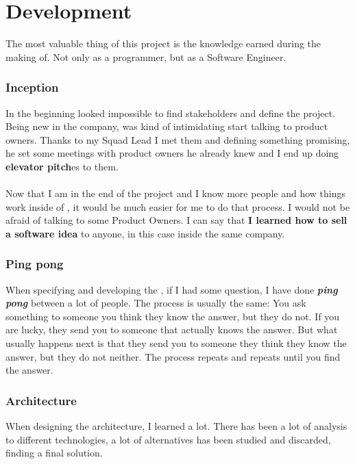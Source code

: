 \section{Development}

The most valuable thing of this project is the knowledge earned during the making of. Not only as a programmer, but as a Software Engineer.

\subsubsection*{Inception}

In the beginning looked impossible to find stakeholders and define the project. Being new in the company, was kind of intimidating start talking to product owners. Thanks to my Squad Lead I met them and defining something promising, he set some meetings with product owners he already knew and I end up doing \textbf{elevator pitch}es to them.
\\\\
Now that I am in the end of the project and I know more people and how things work inside of \company, it would be much easier for me to do that process. I would not be afraid of talking to some Product Owners. I can say that \textbf{I learned how to sell a software idea} to anyone, in this case inside the same company.

\subsubsection*{Ping pong}

When specifying and developing the \thesis, if I had some question, I have done \textbf{\textit{ping pong}} between a lot of people. The process is usually the same: You ask something to someone you think they know the answer, but they do not. If you are lucky, they send you to someone that actually knows the answer. But what usually happens next is that they send you to someone they think they know the answer, but they do not neither. The process repeats and repeats until you find the answer.

\subsubsection*{Architecture}

When designing the architecture, I learned a lot. There has been a lot of analysis to different technologies, a lot of alternatives has been studied and discarded, finding a final solution.

